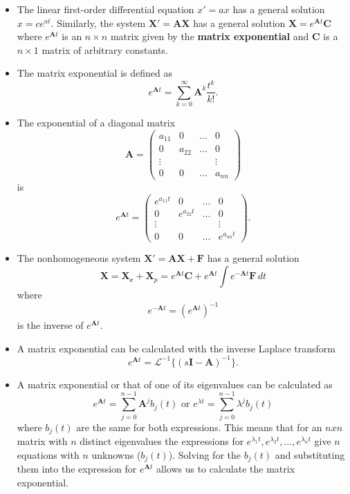 \documentclass{article}
\begin{document}
\begin{itemize}
  \item The linear first-order differential equation $x' = a x$ has a general solution $x = c e^{a t}$. Similarly, the system $\mathbf{X' = A X}$ has a general solution $\mathbf{X} = e^{\mathbf{A} t} \mathbf{C}$ where $e^{\mathbf{A} t}$ is an $n \times n$ matrix given by the \textbf{matrix exponential} and $\mathbf{C}$ is a $n \times 1$ matrix of arbitrary constants.

  \item The matrix exponential is defined as \[e^{\mathbf{A} t} = \sum_{k = 0}^\infty \mathbf{A}^k \frac{t^k}{k!}.\]

  \item The exponential of a diagonal matrix \[\mathbf{A} = \begin{pmatrix}
            a_{11} & 0      & \ldots & 0      \\
            0      & a_{22} & \ldots & 0      \\
            \vdots &        &        & \vdots \\
            0      & 0      & \ldots & a_{nn}
          \end{pmatrix}\] is \[e^{\mathbf{A} t} = \begin{pmatrix}
            e^{a_{11} t} & 0            & \ldots & 0            \\
            0            & e^{a_{22} t} & \ldots & 0            \\
            \vdots       &              &        & \vdots       \\
            0            & 0            & \ldots & e^{a_{nn} t}
          \end{pmatrix}.\]

  \item The nonhomogeneous system $\mathbf{X' = A X + F}$ has a general solution \[\mathbf{X} = \mathbf{X_c} + \mathbf{X}_p = e^{\mathbf{A} t} \mathbf{C} + e^{\mathbf{A} t} \int e^{-\mathbf{A} t} \mathbf{F} \,dt\] where \[e^{-\mathbf{A} t} = (e^{\mathbf{A} t})^{-1}\] is the inverse of $e^{\mathbf{A} t}$.

  \item A matrix exponential can be calculated with the inverse Laplace transform \[e^{\mathbf{A} t} = \mathcal{L}^{-1} \{ (s \mathbf{I} - \mathbf{A})^{-1} \}.\]

  \item A matrix exponential or that of one of its eigenvalues can be calculated as \[e^{\mathbf{A} t} = \sum_{j = 0}^{n - 1} \mathbf{A}^j b_j(t) \text{ or } e^{\lambda t} = \sum_{j = 0}^{n - 1} \lambda^j b_j(t)\] where $b_j(t)$ are the same for both expressions. This means that for an $n x n$ matrix with $n$ distinct eigenvalues the expressions for $e^{\lambda_1 t}, e^{\lambda_2 t}, \ldots, e^{\lambda_n t}$ give $n$ equations with $n$ unknowns ($b_j(t)$). Solving for the $b_j(t)$ and substituting them into the expression for $e^{\mathbf{A} t}$ allows us to calculate the matrix exponential.
\end{itemize}
\end{document}

